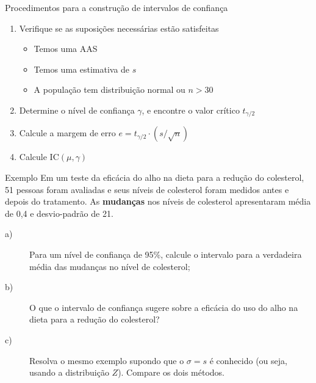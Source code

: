 \documentclass[14pt,aspectratio=1610]{beamer}
\begin{document}
\begin{frame}{Procedimentos para a construção de intervalos de confiança}
    \begin{block}{}
    \justifying
\begin{enumerate}
    \item Verifique se as suposições necessárias estão satisfeitas
    \begin{itemize}
        \item Temos uma AAS
        \item Temos uma estimativa de $s$
        \item A população tem distribuição normal ou $n>30$
    \end{itemize}
   
    \item Determine o nível de confiança $\gamma$, e encontre o valor crítico $t_{\gamma/2}$
    \item Calcule a margem de erro $e = t_{\gamma/2} \cdot (s/\sqrt{n})$
    \item Calcule $\text{IC}(\mu, \gamma)$
\end{enumerate}   
    \end{block}
\end{frame}

\begin{frame}{}
    \begin{block}{Exemplo}
    \justifying
Em um teste da eficácia do alho na dieta para a redução do colesterol, 51 pessoas foram avaliadas e seus níveis de colesterol foram medidos antes e depois do tratamento. As \textbf{mudanças} nos níveis de colesterol apresentaram média de 0,4 e desvio-padrão de
21. 
\begin{description}
\item[a)~]Para um nível de confiança de 95\%, calcule o intervalo para a verdadeira média das mudanças no nível de colesterol;
\item[b)~]O que o intervalo de confiança sugere sobre a eficácia do uso do alho na dieta para a redução do colesterol?
\item[c)~]Resolva o mesmo exemplo supondo que o $\sigma = s$ é conhecido (ou seja, usando a distribuição $Z$). Compare os dois métodos.
\end{description}
\end{block}
\end{frame}
\end{document}
